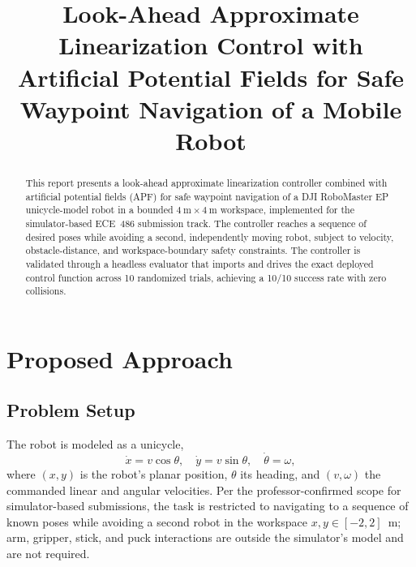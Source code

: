 \documentclass[conference]{IEEEtran}
\begin{document}
\title{Look-Ahead Approximate Linearization Control with Artificial Potential Fields for Safe Waypoint Navigation of a Mobile Robot}

\author{
\and
{}
}

\maketitle

\begin{abstract}
This report presents a look-ahead approximate linearization controller combined with artificial potential fields (APF) for safe waypoint navigation of a DJI RoboMaster EP unicycle-model robot in a bounded $4~\text{m}\times4~\text{m}$ workspace, implemented for the simulator-based ECE~486 submission track. The controller reaches a sequence of desired poses while avoiding a second, independently moving robot, subject to velocity, obstacle-distance, and workspace-boundary safety constraints. The controller is validated through a headless evaluator that imports and drives the exact deployed control function across 10 randomized trials, achieving a 10/10 success rate with zero collisions.
\end{abstract}

\section{Proposed Approach}

\subsection{Problem Setup}
The robot is modeled as a unicycle,
\begin{equation}
\dot{x} = v\cos\theta, \quad \dot{y} = v\sin\theta, \quad \dot{\theta} = \omega,
\label{eq:unicycle}
\end{equation}
where $(x,y)$ is the robot's planar position, $\theta$ its heading, and $(v,\omega)$ the commanded linear and angular velocities. Per the professor-confirmed scope for simulator-based submissions, the task is restricted to navigating to a sequence of known poses while avoiding a second robot in the workspace $x,y \in [-2,2]$~m; arm, gripper, stick, and puck interactions are outside the simulator's model and are not required.
\end{document}
